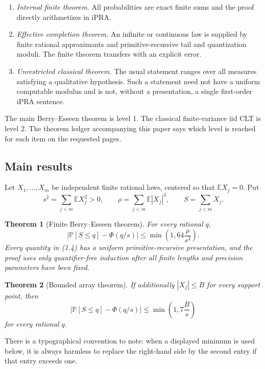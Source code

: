 \documentclass[11pt]{article}
\newtheorem{theorem}{Theorem}[section]
\newcommand{\E}{\mathbb E}
\newcommand{\Pp}{\mathbb P}
\newcommand{\PhiN}{\Phi}
\newcommand{\abs}[1]{\left|#1\right|}
\newcommand{\ipra}{\mathrm{iPRA}}
\begin{document}
\begin{enumerate}
\item \emph{Internal finite theorem.}  All probabilities are exact finite
  sums and the proof directly arithmetizes in \(\ipra\).
\item \emph{Effective completion theorem.}  An infinite or continuous law is
  supplied by finite rational approximants and primitive-recursive tail and
  quantization moduli.  The finite theorem transfers with an explicit error.
\item \emph{Unrestricted classical theorem.}  The usual statement ranges over
  all measures satisfying a qualitative hypothesis.  Such a statement need
  not have a uniform computable modulus and is not, without a presentation,
  a single first-order \(\ipra\) sentence.
\end{enumerate}

The main Berry--Esseen theorem is level 1.  The classical finite-variance iid
CLT is level 2.  The theorem ledger accompanying this paper says which level
is reached for each item on the requested pages.

\subsection{Main results}

Let \(X_1,\ldots,X_m\) be independent finite rational laws, centered so that
\(\E X_j=0\).  Put
\[
 s^2=\sum_{j<m}\E X_j^2>0,
 \qquad \rho=\sum_{j<m}\E|X_j|^3,
 \qquad S=\sum_{j<m}X_j.                               \tag{1.3}
\]

\begin{theorem}[Finite Berry--Esseen theorem]\label{thm:be-main}
For every rational \(q\),
\[
 \abs{\Pp[S\le q]-\PhiN(q/s)}
 \le \min\!\left(1,64\frac{\rho}{s^3}\right).          \tag{1.4}
\]
Every quantity in (1.4) has a uniform primitive-recursive presentation, and
the proof uses only quantifier-free induction after all finite lengths and
precision parameters have been fixed.
\end{theorem}

\begin{theorem}[Bounded array theorem]\label{thm:bounded-main}
If additionally \(|X_j|\le B\) for every support point, then
\[
 \abs{\Pp[S\le q]-\PhiN(q/s)}
 \le \min\!\left(1,7\frac{B}{s}\right)                 \tag{1.5}
\]
for every rational \(q\).
\end{theorem}

There is a typographical convention to note: when a displayed minimum is
used below, it is always harmless to replace the right-hand side by the
second entry if that entry exceeds one.
\end{document}
